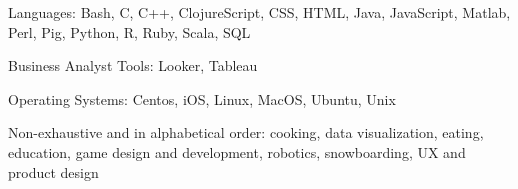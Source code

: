 \documentclass[10pt,a4paper]{article}
\begin{document}
\inlineheadsection
  {Languages:}
  {Bash, C, C++, ClojureScript, CSS, HTML, Java, JavaScript, Matlab, Perl, Pig, Python, R, Ruby, Scala, SQL}

\inlineheadsection
  {Business Analyst Tools:}
  {Looker, Tableau}

\inlineheadsection
  {Operating Systems:}
  {Centos, iOS, Linux, MacOS, Ubuntu, Unix}

\spacedhrule{1.6em}{-0.4em}


\inlineheadsection
  {Non-exhaustive and in alphabetical order:}
  {cooking, data visualization, eating, education, game design and development, robotics, snowboarding, UX and product design}
\end{document}
